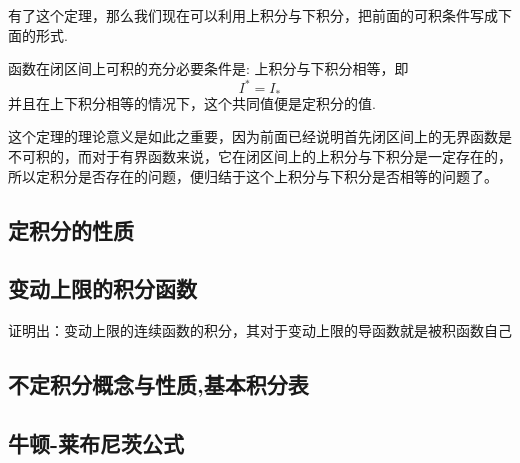 有了这个定理，那么我们现在可以利用上积分与下积分，把前面的可积条件写成下面的形式.
\begin{theorem}
  函数在闭区间上可积的充分必要条件是: 上积分与下积分相等，即
  \[ I^{*} = I_{*} \]
  并且在上下积分相等的情况下，这个共同值便是定积分的值.
\end{theorem}

这个定理的理论意义是如此之重要，因为前面已经说明首先闭区间上的无界函数是不可积的，而对于有界函数来说，它在闭区间上的上积分与下积分是一定存在的，所以定积分是否存在的问题，便归结于这个上积分与下积分是否相等的问题了。



\subsection{定积分的性质}
\label{sec:properties-of-definite-integral}


\subsection{变动上限的积分函数}
\label{sec:variable-upper-limit-integral-function}

证明出：变动上限的连续函数的积分，其对于变动上限的导函数就是被积函数自己

\subsection{不定积分概念与性质,基本积分表}
\label{sec:indefinite-integral}

\subsection{牛顿-莱布尼茨公式}
\label{sec:newton-leibniz-formular}











